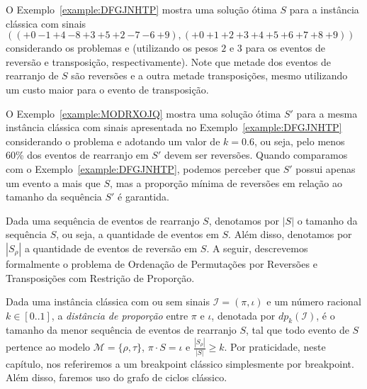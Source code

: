 O Exemplo~\ref{example:DFGJNHTP} mostra uma solução ótima $S$ para a instância clássica com sinais $(({+0}~{-1}~{+4}~{-8}~{+3}~{+5}~{+2}~{-7}~{-6}~{+9}),({+0}~{+1}~{+2}~{+3}~{+4}~{+5}~{+6}~{+7}~{+8}~{+9}))$ considerando os problemas \SbRT{} e \SbWRT{} (utilizando os pesos $2$ e $3$ para os eventos de reversão e transposição, respectivamente). Note que metade dos eventos de rearranjo de $S$ são reversões e a outra metade transposições, mesmo utilizando um custo maior para o evento de transposição.

\pagebreak


O Exemplo~\ref{example:MODRXOJQ} mostra uma solução ótima $S'$ para a mesma instância clássica com sinais apresentada no Exemplo~\ref{example:DFGJNHTP} considerando o problema \SbPRT{} e adotando um valor de $k = 0.6$, ou seja, pelo menos 60\% dos eventos de rearranjo em $S'$ devem ser reversões. Quando comparamos com o Exemplo~\ref{example:DFGJNHTP}, podemos perceber que $S'$ possui apenas um evento a mais que $S$, mas a proporção mínima de reversões em relação ao tamanho da sequência $S'$ é garantida.



Dada uma sequência de eventos de rearranjo $S$, denotamos por $|S|$ o tamanho da sequência $S$, ou seja, a quantidade de eventos em $S$. Além disso, denotamos por $|S_{\rho}|$ a quantidade de eventos de reversão em $S$. A seguir, descrevemos formalmente o problema de Ordenação de Permutações por Reversões e Transposições com Restrição de Proporção.

\begin{task}
\end{task}

Dada uma instância clássica com ou sem sinais $\mathcal{I}=(\pi,\iota)$ e um número racional $k \in [0..1]$, a \emph{distância de proporção} entre $\pi$ e $\iota$, denotada por $dp_{k}(\mathcal{I})$, é o tamanho da menor sequência de eventos de rearranjo $S$, tal que todo evento de $S$ pertence ao modelo $\mathcal{M}=\{\rho,\tau\}$, $\pi \cdot S = \iota$ e $\frac{|S_{\rho}|}{|S|} \ge k$. Por praticidade, neste capítulo, nos referiremos a um breakpoint clássico simplesmente por breakpoint. Além disso, faremos uso do grafo de ciclos clássico.

